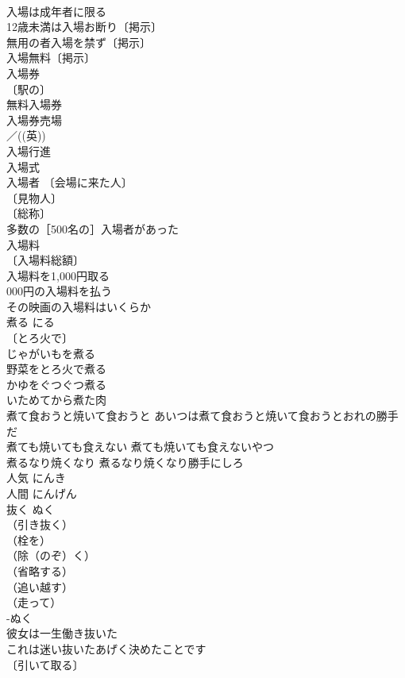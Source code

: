 \documentclass[8pt]{extreport}
\begin{document}
\begin{CJK}{UTF8}{min}
\\	入場は成年者に限る 
\\	12歳未満は入場お断り〔掲示〕 
\\	無用の者入場を禁ず〔掲示〕 
\\	入場無料〔掲示〕 
\\	入場券 
\\	〔駅の〕
\\	無料入場券 
\\	入場券売場 
\\	／((英)) 
\\	入場行進 
\\	入場式 
\\	入場者 〔会場に来た人〕
\\	〔見物人〕
\\	〔総称〕
\\	多数の［500名の］入場者があった 
\\	入場料 
\\	〔入場料総額〕
\\	入場料を1,000円取る 
\\	000円の入場料を払う 
\\	その映画の入場料はいくらか 
\\	煮る	にる	
\\	〔とろ火で〕
\\	じゃがいもを煮る 
\\	野菜をとろ火で煮る 
\\	かゆをぐつぐつ煮る 
\\	いためてから煮た肉 
\\	煮て食おうと焼いて食おうと あいつは煮て食おうと焼いて食おうとおれの勝手だ 
\\	煮ても焼いても食えない 煮ても焼いても食えないやつ 
\\	煮るなり焼くなり 煮るなり焼くなり勝手にしろ 
\\	人気	にんき	
\\	人間	にんげん	
\\	抜く	ぬく	
\\	（引き抜く）
\\	（栓を）
\\	（除（のぞ）く）
\\	（省略する）
\\	（追い越す）
\\	（走って）
\\	-ぬく 
\\	彼女は一生働き抜いた 
\\	これは迷い抜いたあげく決めたことです 
\\	〔引いて取る〕

\end{CJK}
\end{document}
